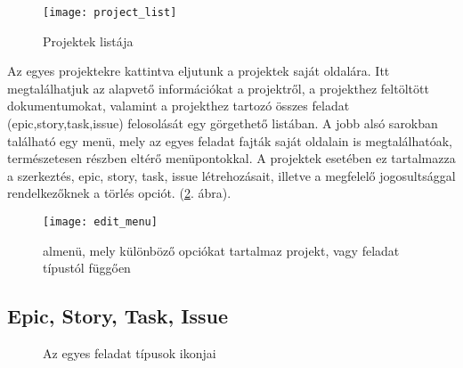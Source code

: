 \begin{figure}[H]
	\centering
	\texttt{[image: project\_list]}
	\caption{Projektek listája}
	\label{fig:example-3}
\end{figure}

Az egyes projektekre kattintva eljutunk a projektek saját oldalára. Itt megtalálhatjuk az alapvető információkat a projektről, a projekthez feltöltött dokumentumokat, valamint a projekthez tartozó összes feladat (epic,story,task,issue) felosolását egy görgethető listában. A jobb alsó sarokban található egy menü, mely az egyes feladat fajták saját oldalain is megtalálhatóak, természetesen részben eltérő menüpontokkal. A projektek esetében ez tartalmazza a szerkeztés, epic, story, task, issue létrehozásait, illetve a megfelelő jogosultsággal rendelkezőknek a törlés opciót. (\ref{fig:example-4}. ábra).

\begin{figure}[H]
	\centering
	\texttt{[image: edit\_menu]}
	\caption{almenü, mely különböző opciókat tartalmaz projekt, vagy feladat típustól függően}
	\label{fig:example-4}
\end{figure}

\subsection{Epic, Story, Task, Issue}
\label{stories}

\begin{figure}[H]
	\centering
	\hspace{35pt}
	\hspace{35pt}
	\hspace{35pt}
	\caption{Az egyes feladat típusok ikonjai}
	\label{fig:example-5}
\end{figure}


